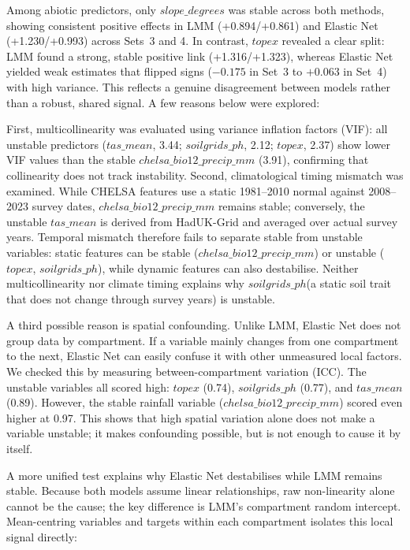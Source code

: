 \documentclass[logo,msc,ai]{infthesis}           %
\begin{document}
Among abiotic predictors, only $\mathit{slope\_degrees}$ was stable across both methods, showing consistent positive effects in LMM (+0.894/+0.861) and Elastic Net (+1.230/+0.993) across Sets~3 and 4. In contrast, $\mathit{topex}$ revealed a clear split: LMM found a strong, stable positive link (+1.316/+1.323), whereas Elastic Net yielded weak estimates that flipped signs ($-0.175$ in Set~3 to $+0.063$ in Set~4) with high variance. This reflects a genuine disagreement between models rather than a robust, shared signal. A few reasons below were explored: 

First, multicollinearity was evaluated using variance inflation factors (VIF): all unstable predictors ($\mathit{tas\_mean}$, 3.44; $\mathit{soilgrids\_ph}$, 2.12; $\mathit{topex}$, 2.37) show lower VIF values than the stable $\mathit{chelsa\_bio12\_precip\_mm}$ (3.91), confirming that collinearity does not track instability. 
Second, climatological timing mismatch was examined. While CHELSA features use a static 1981--2010 normal against 2008--2023 survey dates, $\mathit{chelsa\_bio12\_precip\_mm}$ remains stable; conversely, the unstable $\mathit{tas\_mean}$ is derived from HadUK-Grid and averaged over actual survey years. Temporal mismatch therefore fails to separate stable from unstable variables: static features can be stable ($\mathit{chelsa\_bio12\_precip\_mm}$) or unstable ($\mathit{topex}$, $\mathit{soilgrids\_ph}$), while dynamic features can also destabilise. 
Neither multicollinearity nor climate timing explains why $\mathit{soilgrids\_ph}$(a static soil trait that does not change through survey years) is unstable.

A third possible reason is spatial confounding. Unlike LMM, Elastic Net does not group data by compartment. If a variable mainly changes from one compartment to the next, Elastic Net can easily confuse it with other unmeasured local factors. We checked this by measuring between-compartment variation (ICC). The unstable variables all scored high: $\mathit{topex}$ (0.74), $\mathit{soilgrids\_ph}$ (0.77), and $\mathit{tas\_mean}$ (0.89). However, the stable rainfall variable ($\mathit{chelsa\_bio12\_precip\_mm}$) scored even higher at 0.97. This shows that high spatial variation alone does not make a variable unstable; it makes confounding possible, but is not enough to cause it by itself.

A more unified test explains why Elastic Net destabilises while LMM remains stable. Because both models assume linear relationships, raw non-linearity alone cannot be the cause; the key difference is LMM's compartment random intercept. Mean-centring variables and targets within each compartment isolates this local signal directly:
\end{document}
